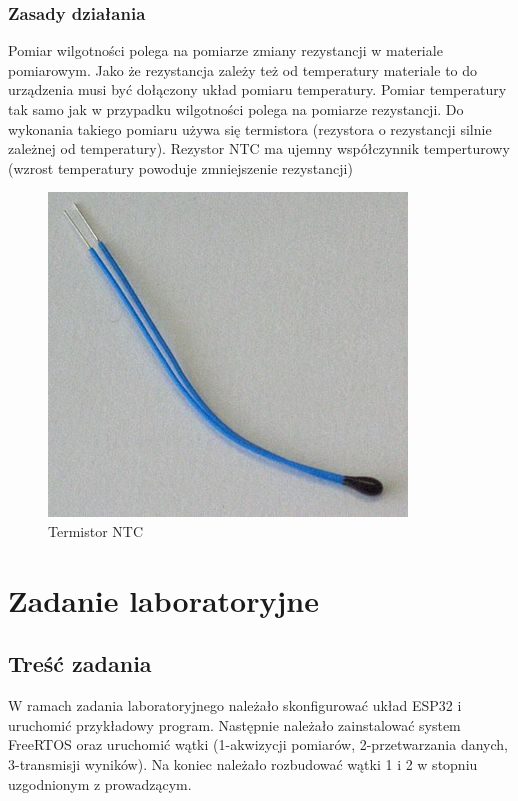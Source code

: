 \documentclass{article}
\begin{document}
            \subsubsection{Zasady działania}
                \raggedright
                Pomiar wilgotności polega na pomiarze zmiany rezystancji w materiale pomiarowym.
                Jako że rezystancja zależy też od temperatury materiale to do urządzenia musi być
                dołączony układ pomiaru temperatury.\linebreak
                Pomiar temperatury tak samo jak w przypadku wilgotności polega na pomiarze
                rezystancji. Do wykonania takiego pomiaru używa się termistora (rezystora o 
                rezystancji silnie zależnej od temperatury). Rezystor NTC ma ujemny współczynnik 
                temperturowy (wzrost temperatury powoduje zmniejszenie rezystancji)
                \begin{figure}[ht]
                    \centering
                    \includegraphics[width=\textwidth]{images/360px-NTC_bead.jpg}
                    \caption{Termistor NTC}
                    \label{fig:NTC}
                \end{figure}
                \FloatBarrier
    \section{Zadanie laboratoryjne}
        \subsection{Treść zadania}
            W ramach zadania laboratoryjnego należało skonfigurować układ ESP32 i uruchomić przykładowy 
            program. Następnie należało zainstalować system FreeRTOS oraz uruchomić wątki (1-akwizycji 
            pomiarów, 2-przetwarzania danych, 3-transmisji wyników). Na koniec należało rozbudować 
            wątki 1 i 2 w stopniu uzgodnionym z prowadzącym. 
\end{document}
